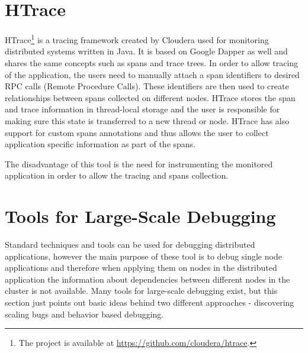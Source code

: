  \section{HTrace}
 \label{htrace}
 HTrace\footnote{The project is available at \url{https://github.com/cloudera/htrace}.} is a tracing framework created by Cloudera used for monitoring distributed systems written in Java. It is based on Google Dapper as well and shares the same concepts such as spans and trace trees. In order to allow tracing of the application, the users need to manually attach a span identifiers to desired RPC calls (Remote Procedure Calls). These identifiers are then used to create relationships between spans collected on different nodes. HTrace stores the span and trace information in thread-local storage and the user is responsible for making sure this state is transferred to a new thread or node. HTrace has also support for custom spans annotations and thus allows the user to collect application specific information as part of the spans. 
 
 The disadvantage of this tool is the need for instrumenting the monitored application in order to allow the tracing and spans collection.
\section{Tools for Large-Scale Debugging}
Standard techniques and tools can be used for debugging distributed applications, however the main purpose of these tool is to debug single node applications and therefore when applying them on nodes in the distributed application the information about dependencies between different nodes in the cluster is not available. Many tools for large-scale debugging exist, but this section just points out basic ideas behind two different approaches - discovering scaling bugs and behavior based debugging. 

